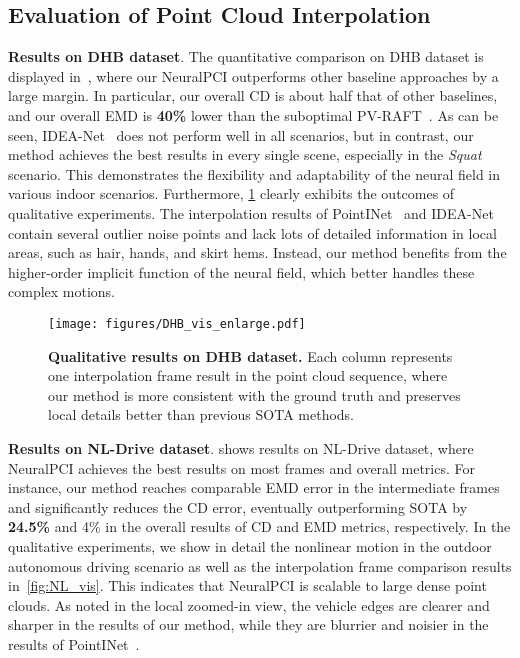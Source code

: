 \documentclass[10pt,twocolumn,letterpaper]{article}
\begin{document}
%
 


\subsection{Evaluation of Point Cloud Interpolation}
\textbf{Results on DHB dataset}. The quantitative comparison on DHB dataset is displayed in~, where our NeuralPCI outperforms other baseline approaches by a large margin. In particular, our overall CD is about half that of other baselines, and our overall EMD is \textbf{40\%} lower than the suboptimal PV-RAFT~\cite{wei2021pv}. As can be seen, IDEA-Net~\cite{zeng2022idea} does not perform well in all scenarios, but in contrast, our method achieves the best results in every single scene, especially in the \textit{Squat} scenario. This demonstrates the flexibility and adaptability of the neural field in various indoor scenarios. Furthermore, \cref{fig:DHB_vis} clearly exhibits the outcomes of qualitative experiments. The interpolation results of PointINet~\cite{lu2021pointinet} and IDEA-Net contain several outlier noise points and lack lots of detailed information in local areas, such as hair, hands, and skirt hems. Instead, our method benefits from the higher-order implicit function of the neural field, which better handles these complex motions.



\begin{figure}[ht]
\centering
  \texttt{[image: figures/DHB\_vis\_enlarge.pdf]}
  \caption{\textbf{Qualitative results on DHB dataset.} Each column represents one interpolation frame result in the point cloud sequence, where our method is more consistent with the ground truth and preserves local details better than previous SOTA methods.}
  \label{fig:DHB_vis}
\vspace{-.4cm}
\end{figure}  

\textbf{Results on NL-Drive dataset}.  shows results on NL-Drive dataset, where NeuralPCI achieves the best results on most frames and overall metrics. For instance, our method reaches comparable EMD error in the intermediate frames and significantly reduces the CD error, eventually outperforming SOTA by \textbf{24.5\%} and 4\% in the overall results of CD and EMD metrics, respectively. In the qualitative experiments, we show in detail the nonlinear motion in the outdoor autonomous driving scenario as well as the interpolation frame comparison results in~\cref{fig:NL_vis}. This indicates that NeuralPCI is scalable to large dense point clouds. As noted in the local zoomed-in view, the vehicle edges are clearer and sharper in the results of our method, while they are blurrier and noisier in the results of PointINet~\cite{lu2021pointinet}.
\end{document}

